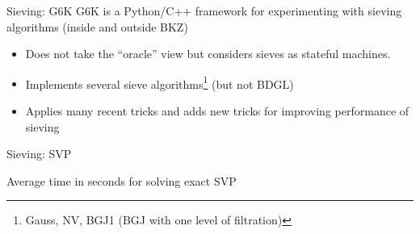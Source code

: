 \documentclass[xcolor=table,10pt,aspectratio=169]{beamer}
\begin{document}
\begin{frame}[label={sec:org8a6a511}]{Sieving: G6K}
G6K  is a Python/C++ framework for experimenting with sieving algorithms (inside and outside BKZ)
\begin{itemize}
\item Does not take the “oracle” view but considers sieves as stateful machines.
\item Implements several sieve algorithms\footnote{Gauss, NV, BGJ1 (BGJ with one level of filtration)} (but not BDGL)
\item Applies many recent tricks and adds new tricks for improving performance of sieving
\end{itemize}
\end{frame}

\begin{frame}[label={sec:orgf61b1a7}]{Sieving: SVP}
\begin{center}
Average time in seconds for solving exact SVP
\end{center}
\end{frame}
\end{document}
